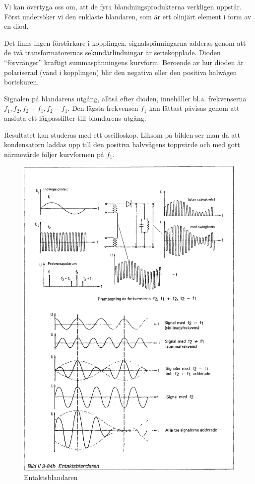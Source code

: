 Vi kan övertyga oss om, att de fyra blandningsprodukterna verkligen
uppstår. Först undersöker vi den enklaste blandaren, som är ett
olinjärt element i form av en diod.

Det finns ingen förstärkare i kopplingen.  signalspänningarna adderas
genom att de två transformatorernas sekundärlindningar är
seriekopplade. Dioden ``förvränger'' kraftigt summaspänningens
kurvform. Beroende av hur dioden är polariserad (vänd i kopplingen)
blir den negativa eller den positiva halwågen bortskuren.

Signalen på blandarens utgång, alltså efter dioden, innehåller
bl.a. frekvenserna \(f_1, f_2, f_2+f_1, f_2-f_1\). Den lägsta
frekvensen \(f_1\) kan lättast påvisas genom att ansluta ett
lågpassfilter till blandarens utgång.

Resultatet kan studeras med ett oscilloskop. Liksom på bilden ser man
då att kondensatorn laddas upp till den positiva halvvågens toppvärde
och med gott närmevärde följer kurvformen på \(f_1\).

\begin{figure}
\includegraphics[width=\textwidth]{images/bild_2_3-84b}
\caption{Entaktsblandaren}
\label{fig:BildII3-84b}
\end{figure}

